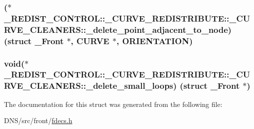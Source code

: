 \subsubsection[{\texorpdfstring{\+\_\+delete\+\_\+point\+\_\+adjacent\+\_\+to\+\_\+node}{_delete_point_adjacent_to_node}}]{($\ast$ \+\_\+\+R\+E\+D\+I\+S\+T\+\_\+\+C\+O\+N\+T\+R\+O\+L\+::\+\_\+\+C\+U\+R\+V\+E\+\_\+\+R\+E\+D\+I\+S\+T\+R\+I\+B\+U\+T\+E\+::\+\_\+\+C\+U\+R\+V\+E\+\_\+\+C\+L\+E\+A\+N\+E\+R\+S\+::\+\_\+delete\+\_\+point\+\_\+adjacent\+\_\+to\+\_\+node) (struct {\bf \+\_\+\+Front} $\ast$, {\bf C\+U\+R\+VE} $\ast$, {\bf O\+R\+I\+E\+N\+T\+A\+T\+I\+ON})}\hypertarget{struct___r_e_d_i_s_t___c_o_n_t_r_o_l_1_1___c_u_r_v_e___r_e_d_i_s_t_r_i_b_u_t_e_1_1___c_u_r_v_e___c_l_e_a_n_e_r_s_a1f83de881fba0a7b44fc2a787945458f}{}\label{struct___r_e_d_i_s_t___c_o_n_t_r_o_l_1_1___c_u_r_v_e___r_e_d_i_s_t_r_i_b_u_t_e_1_1___c_u_r_v_e___c_l_e_a_n_e_r_s_a1f83de881fba0a7b44fc2a787945458f}
\subsubsection[{\texorpdfstring{\+\_\+delete\+\_\+small\+\_\+loops}{_delete_small_loops}}]{\setlength{\rightskip}{0pt plus 5cm}void($\ast$ \+\_\+\+R\+E\+D\+I\+S\+T\+\_\+\+C\+O\+N\+T\+R\+O\+L\+::\+\_\+\+C\+U\+R\+V\+E\+\_\+\+R\+E\+D\+I\+S\+T\+R\+I\+B\+U\+T\+E\+::\+\_\+\+C\+U\+R\+V\+E\+\_\+\+C\+L\+E\+A\+N\+E\+R\+S\+::\+\_\+delete\+\_\+small\+\_\+loops) (struct {\bf \+\_\+\+Front} $\ast$)}\hypertarget{struct___r_e_d_i_s_t___c_o_n_t_r_o_l_1_1___c_u_r_v_e___r_e_d_i_s_t_r_i_b_u_t_e_1_1___c_u_r_v_e___c_l_e_a_n_e_r_s_ae62bd1ac39bffa8c6793501716178cdc}{}\label{struct___r_e_d_i_s_t___c_o_n_t_r_o_l_1_1___c_u_r_v_e___r_e_d_i_s_t_r_i_b_u_t_e_1_1___c_u_r_v_e___c_l_e_a_n_e_r_s_ae62bd1ac39bffa8c6793501716178cdc}


The documentation for this struct was generated from the following file\+:\begin{DoxyCompactItemize}
\item 
D\+N\+S/src/front/\hyperlink{fdecs_8h}{fdecs.\+h}\end{DoxyCompactItemize}
